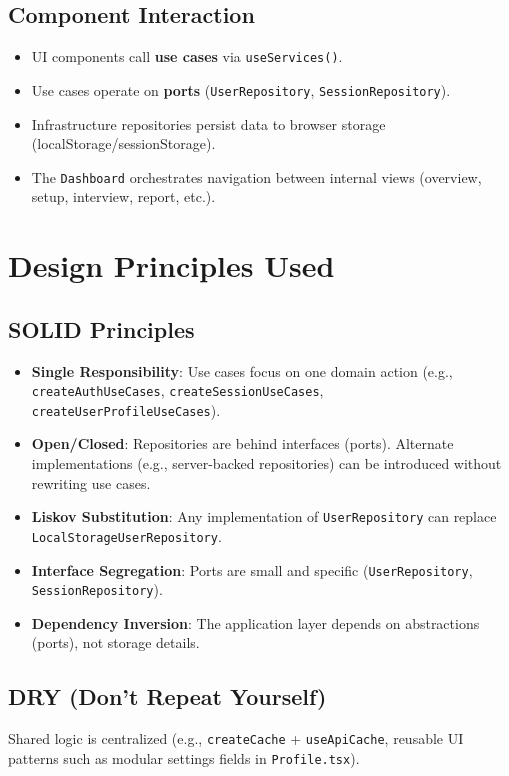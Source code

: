 \documentclass[11pt]{article}
\begin{document}
\subsection{Component Interaction}
\begin{itemize}[leftmargin=1.2em]
  \item UI components call \textbf{use cases} via \texttt{useServices()}.
  \item Use cases operate on \textbf{ports} (\texttt{UserRepository}, \texttt{SessionRepository}).
  \item Infrastructure repositories persist data to browser storage (localStorage/sessionStorage).
  \item The \texttt{Dashboard} orchestrates navigation between internal views (overview, setup, interview, report, etc.).
\end{itemize}

\section{Design Principles Used}

\subsection{SOLID Principles}
\begin{itemize}[leftmargin=1.2em]
  \item \textbf{Single Responsibility}: Use cases focus on one domain action (e.g., \texttt{createAuthUseCases}, \texttt{createSessionUseCases}, \texttt{createUserProfileUseCases}).
  \item \textbf{Open/Closed}: Repositories are behind interfaces (ports). Alternate implementations (e.g., server-backed repositories) can be introduced without rewriting use cases.
  \item \textbf{Liskov Substitution}: Any implementation of \texttt{UserRepository} can replace \texttt{LocalStorageUserRepository}.
  \item \textbf{Interface Segregation}: Ports are small and specific (\texttt{UserRepository}, \texttt{SessionRepository}).
  \item \textbf{Dependency Inversion}: The application layer depends on abstractions (ports), not storage details.
\end{itemize}

\subsection{DRY (Don't Repeat Yourself)}
Shared logic is centralized (e.g., \texttt{createCache} + \texttt{useApiCache}, reusable UI patterns such as modular settings fields in \texttt{Profile.tsx}).
\end{document}
